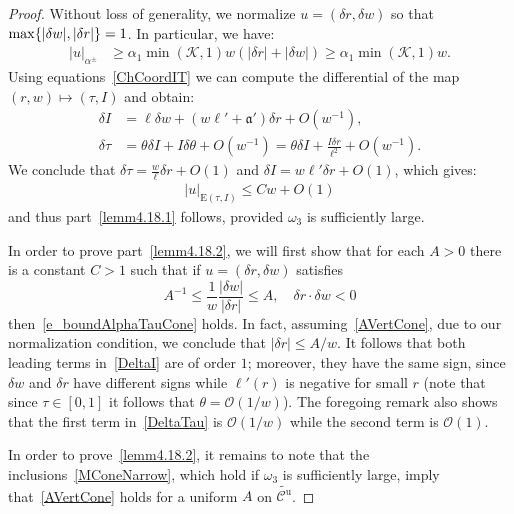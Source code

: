 \documentclass[AHL, Unicode, longabstracts,published]{cedram}
\newcommand{\ct}{r}
\newcommand{\inv}{^{-1}}
\newcommand{\unstable}{\text{u}}
\newcommand{\fka}{\mathfrak{a}}
\newcommand{\cK}{\mathcal{K}}
\newcommand{\cO}{\mathcal{O}}
\newcommand{\cone}{\mathcal{C}}
\newcommand{\coneu}{\cone^\unstable}
\newcommand{\mconeu}{{\widetilde{\coneu}}}
\newcommand{\law}[1]{\omega_{#1}}
\newcommand{\admPm}{_{\alpha^{\pm}}}
\begin{document}
\begin{proof}
Without loss of generality, we normalize $u = (\delta r,\delta w)$ so that $\max\{|\delta w|, \linebreak |\delta \ct|\}=1$. In particular, we have:
\begin{align*}
|u|\admPm&\ge \alpha_{1}\min(\cK,1)w(|\delta r|+|\delta w|)\ge
\alpha_{1}\min(\cK,1)w.
\end{align*}
Using equations~\eqref{ChCoordIT} we can compute the differential of the map $(r,w)\mapsto(\tau,I)$ and obtain:
\begin{subequations}
\begin{align}\label{DeltaI}
\delta I&=\ell \delta w+\left(w \ell' +\fka'\right)\delta \ct+O(w\inv),\\\label{DeltaTau}
\delta \tau&=\theta \delta I+I\delta \theta+O(w\inv)=\theta \delta I+ \frac{I\delta \ct}{\ell^2}+O(w\inv).
\end{align}
\end{subequations}
We conclude that $\delta\tau = \frac{w}\ell \delta r+O(1)$ and $\delta I = w\ell' \delta r+O(1)$, which gives:
\begin{align*}
|u|_{\text{E}(\tau,I)}\le C w+O(1)
\end{align*}
and thus part~\eqref{lemm4.18.1} follows, provided $\law3$ is sufficiently large.

In order to prove part~\eqref{lemm4.18.2}, we will first show that for each $A > 0$ there is a constant $C > 1$ such that if $u = (\delta r,\delta w)$ satisfies
\begin{equation}\label{AVertCone}
A^{-1}\leq \frac1w
\frac{|\delta w |}{|\delta \ct|} \leq A, \quad \delta \ct\cdot\delta w<0
\end{equation}
then~\eqref{e_boundAlphaTauCone} holds. In fact, assuming~\eqref{AVertCone}, due to our normalization condition, we conclude that $|\delta \ct|\leq A/w$. It follows that both leading terms in~\eqref{DeltaI} are of order $1$; moreover, they have the same sign, since $\delta w$ and $\delta\ct$ have different signs while $\ell'(\ct)$ is negative for small $\ct$ (note that since $\tau\in [0,1]$ it follows that $\theta=\cO(1/w)$). The foregoing remark also shows that the first term in~\eqref{DeltaTau} is $\cO(1/w)$ while the second term is $\cO(1).$

In order to prove~\eqref{lemm4.18.2}, it remains to note that the inclusions~\eqref{MConeNarrow}, which hold if $\law3$ is sufficiently large, imply that~\eqref{AVertCone} holds for a uniform $A$ on $\mconeu$.
\end{proof}
\end{document}
